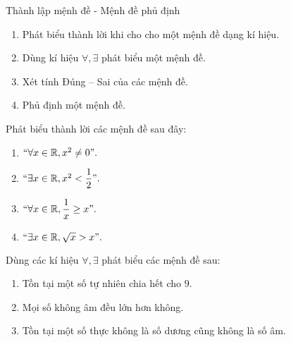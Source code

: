 
\begin{dang}{Thành lập mệnh đề - Mệnh đề phủ định}
	\begin{enumerate}
		\item Phát biểu thành lời khi cho cho một mệnh đề dạng kí hiệu.
		\item Dùng kí hiệu $\forall, \exists$ phát biểu một mệnh đề.
		\item Xét tính Đúng -- Sai của các mệnh đề.
		\item Phủ định một mệnh đề.
	\end{enumerate}
	
\end{dang}	

\begin{vd}%
	Phát biểu thành lời các mệnh đề sau đây:
	\begin{enumerate}
		\item $``\forall x\in \mathbb{R}, x^2 \neq 0".$
		\item $``\exists x\in \mathbb{R}, x^2<\dfrac{1}{2}".$
		\item $``\forall x\in \mathbb{R}, \dfrac{1}{x} \geq x".$
		\item $``\exists x\in \mathbb{R}, \sqrt{x} >x".$
	\end{enumerate}
\end{vd}

\begin{vd}%
	Dùng các kí hiệu $\forall, \exists$ phát biểu các mệnh đề sau:
	\begin{enumerate}
		\item Tồn tại một số tự nhiên chia hết cho $9.$
		\item Mọi số không âm đều lớn hơn không.
		\item Tồn tại một số thực không là số dương cũng không là số âm. 
	\end{enumerate}
\end{vd}

